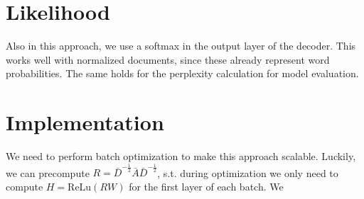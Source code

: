 \documentclass{article}
\begin{document}
\section{Likelihood}
Also in this approach, we use a softmax in the output layer of the decoder. This works well with normalized documents, since these already represent word probabilities. The same holds for the perplexity calculation for model evaluation.

\section{Implementation}

We need to perform batch optimization to make this approach scalable. Luckily, we can precompute $R =  \bar{D}^{-\frac{1}{2}}\bar{A}\bar{D}^{-\frac{1}{2}}$, s.t. during optimization we only need to compute $H = \text{ReLu}(RW)$ for the first layer of each batch. We 
\end{document}
